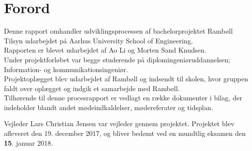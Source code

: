 \chapter*{Forord}
Denne rapport omhandler udviklingsprocessen af bachelorprojektet Rambøll Tilsyn udarbejdet på Aarhus University School of Engineering. \\
Rapporten er blevet udarbejdet af Ao Li og Morten Sand Knudsen. \\ 
Under projektforløbet var begge studerende på diplomingeniøruddannelsen; Information- og kommunikationsingeniør. \\
Projektoplægget blev udarbejdet af Rambøll og indsendt til skolen, hvor gruppen faldt over oplægget og indgik et samarbejde med Rambøll. \\
Tilhørende til denne procesrapport er vedlagt en række dokumenter i bilag, der indeholder blandt andet mødeindkaldelser,
mødereferater og tidsplan. 

Vejleder Lars Christian Jensen var vejleder gennem projektet. Projektet blev afleveret den 19.
december 2017, og bliver bedømt ved en mundtlig eksamen den \textbf{15}. januar 2018.